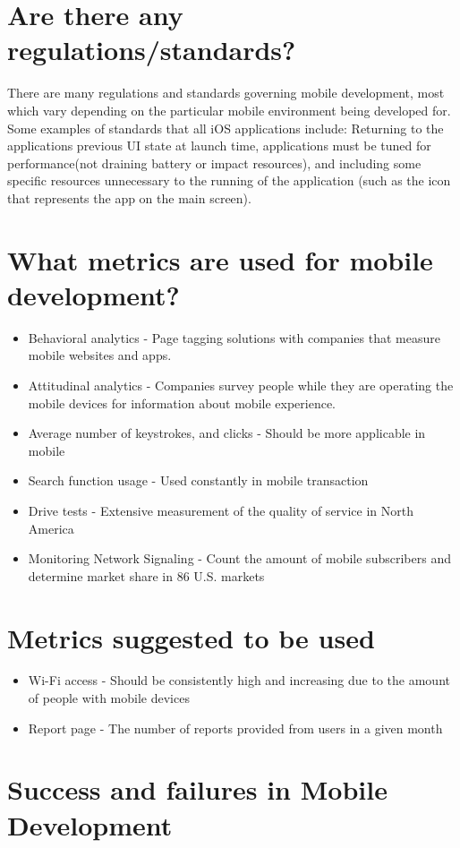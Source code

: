 \documentclass{article}
\begin{document}
	\section*{Are there any regulations/standards?}
		There are many regulations and standards governing mobile development, most which vary depending on the particular mobile environment being developed for. Some examples of standards that all iOS applications include: Returning to the applications previous UI state at launch time, applications must be tuned for performance(not draining battery or impact resources), and including some specific resources unnecessary to the running of the application (such as the icon that represents the app on the main screen).
	\section*{What metrics are used for mobile development?}
		\begin{itemize}
			\item Behavioral analytics - Page tagging solutions with companies that measure mobile websites and apps.
			\item Attitudinal analytics - Companies survey people while they are operating the mobile devices for information about mobile experience.
			\item Average number of keystrokes, and clicks - Should be more applicable in mobile
			\item Search function usage - Used constantly in mobile transaction
			\item Drive tests - Extensive measurement of the quality of service in North America
			\item Monitoring Network Signaling - Count the amount of mobile subscribers and determine market share in 86 U.S. markets
		\end{itemize}
	\section*{Metrics suggested to be used}
		\begin{itemize}
			\item Wi-Fi access - Should be consistently high and increasing due to the amount of people with mobile devices
			\item Report page - The number of reports provided from users in a given month
		\end{itemize}
	\section*{Success and failures in Mobile Development}
\end{document}
